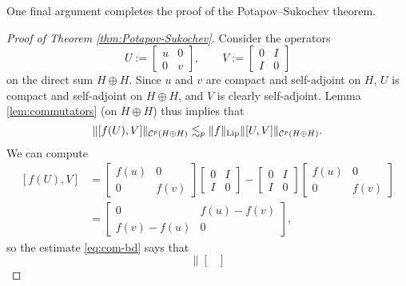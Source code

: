 One final argument completes the proof of the Potapov--Sukochev theorem.

\begin{proof}[Proof of Theorem \ref{thm:Potapov-Sukochev}]
  Consider the operators
  \begin{equation*}
    U := \begin{bmatrix} u & 0 \\ 0 & v
    \end{bmatrix},
    \qquad
    V := \begin{bmatrix} 0 & I \\ I & 0
    \end{bmatrix}
  \end{equation*}
  on the direct sum $H \oplus H$.
  Since $u$ and $v$ are compact and self-adjoint on $H$, $U$ is compact and self-adjoint on $H \oplus H$, and $V$ is clearly self-adjoint.
  Lemma \ref{lem:commutators} (on $H \oplus H$) thus implies that
  \begin{equation}\label{eq:com-bd}
    \|[f(U),V]\|_{\mathcal{C}^{p}(H \oplus H)} \lesssim_{p} \|f\|_{\mathrm{Lip}} \|[U,V]\|_{\mathcal{C}^{p}(H \oplus H)}.
  \end{equation}
  We can compute
  \begin{equation*}
    \begin{aligned}
      [f(U),V]
      &= \begin{bmatrix} f(u) & 0 \\ 0 & f(v) \end{bmatrix}
      \begin{bmatrix} 0 & I \\ I & 0 \end{bmatrix}
      -
      \begin{bmatrix} 0 & I \\ I & 0 \end{bmatrix}
      \begin{bmatrix} f(u) & 0 \\ 0 & f(v) \end{bmatrix} \\
      &= \begin{bmatrix}
        0 & f(u) - f(v) \\ f(v) - f(u) & 0
        \end{bmatrix},
    \end{aligned}
  \end{equation*}
  so the estimate \eqref{eq:com-bd} says that
  \begin{equation*}
    \Bigg\| \begin{bmatrix}

\end{bmatrix}
\end{equation*}
\end{proof}
